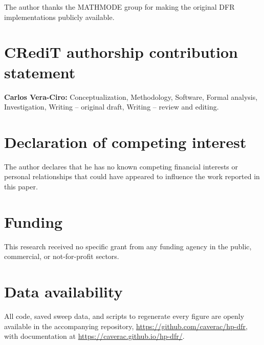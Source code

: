 \documentclass[preprint,11pt]{elsarticle}
\begin{document}
The author thanks the MATHMODE group for making the original DFR implementations publicly available.

\section*{CRediT authorship contribution statement}

\textbf{Carlos Vera-Ciro:} Conceptualization, Methodology, Software, Formal analysis, Investigation, Writing -- original draft, Writing -- review and editing.

\section*{Declaration of competing interest}

The author declares that he has no known competing financial interests or personal relationships that could have appeared to influence the work reported in this paper.

\section*{Funding}

This research received no specific grant from any funding agency in the public, commercial, or not-for-profit sectors.

\section*{Data availability}

All code, saved sweep data, and scripts to regenerate every figure are openly available in the accompanying repository, \url{https://github.com/caverac/hp-dfr}, with documentation at \url{https://caverac.github.io/hp-dfr/}.


\end{document}
